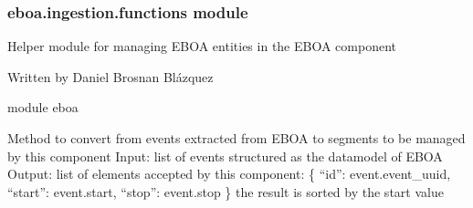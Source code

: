 \begin{fulllineitems}
\label{\detokenize{eboa.ingestion:eboa.ingestion.eboa_ingestion.main}}
\end{fulllineitems}



\subsubsection{eboa.ingestion.functions module}
\label{\detokenize{eboa.ingestion:module-eboa.ingestion.functions}}\label{\detokenize{eboa.ingestion:eboa-ingestion-functions-module}}
Helper module for managing EBOA entities in the EBOA component

Written by Daniel Brosnan Blázquez

module eboa

\begin{fulllineitems}
\label{\detokenize{eboa.ingestion:eboa.ingestion.functions.convert_eboa_events_to_date_segments}}
Method to convert from events extracted from EBOA to segments to be managed by this component
Input: list of events structured as the datamodel of EBOA
Output: list of elements accepted by this component:
\{
“id”: event.event\_uuid,
“start”: event.start,
“stop”: event.stop
\}
the result is sorted by the start value

\end{fulllineitems}


